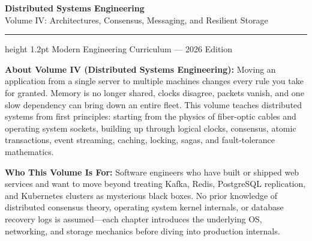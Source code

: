 \documentclass[11pt,oneside]{book}
\begin{document}
\frontmatter
\pagestyle{empty}

\begin{center}
  \vspace*{2.0cm}
  {\Huge\sffamily\bfseries\color{headingblue} Distributed Systems Engineering}\\[12pt]
  {\LARGE\sffamily\color{gray} Volume IV: Architectures, Consensus, Messaging, and Resilient Storage}\\[28pt]
  \hrule height 1.2pt
  \vspace*{25pt}
  {\normalsize\sffamily Modern Engineering Curriculum --- 2026 Edition}
\end{center}

\vspace{2.2cm}

\begin{tcolorbox}[
  enhanced,
  colback=white,
  colframe=gray!30!white,
  boxrule=0.8pt,
  arc=2pt,
  left=15pt,right=15pt,top=12pt,bottom=12pt
]
\sffamily\small
\textbf{About Volume IV (Distributed Systems Engineering):}
Moving an application from a single server to multiple machines changes every rule you take for granted. Memory is no longer shared, clocks disagree, packets vanish, and one slow dependency can bring down an entire fleet. This volume teaches distributed systems from first principles: starting from the physics of fiber-optic cables and operating system sockets, building up through logical clocks, consensus, atomic transactions, event streaming, caching, locking, sagas, and fault-tolerance mathematics.

\vspace{8pt}
\textbf{Who This Volume Is For:}
Software engineers who have built or shipped web services and want to move beyond treating Kafka, Redis, PostgreSQL replication, and Kubernetes clusters as mysterious black boxes. No prior knowledge of distributed consensus theory, operating system kernel internals, or database recovery logs is assumed---each chapter introduces the underlying OS, networking, and storage mechanics before diving into production internals.


\end{tcolorbox}
\end{document}
